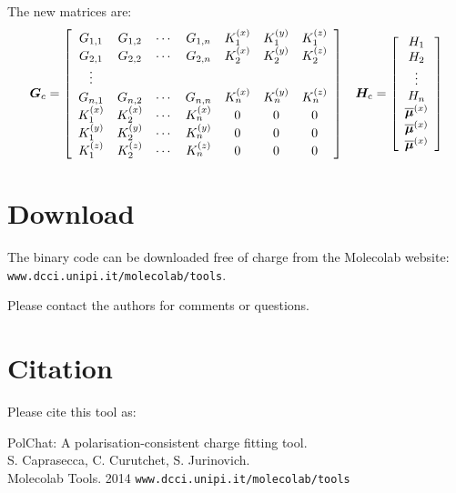 \documentclass[a4paper]{report}
\newcommand{\bs}{\boldsymbol}
\newcommand{\mr}{\mathrm}
\begin{document}
The new matrices are:
\begin{equation}
\bs{G}_c = \left[ \begin{array}{ccccccccr} 
G_{1,1}   & G_{1,2}   & \cdots & G_{1,n}   & K_1^{(x)} & K_1^{(y)} & K_1^{(z)} \\
G_{2,1}   & G_{2,2}   & \cdots & G_{2,n}   & K_2^{(x)} & K_2^{(y)} & K_2^{(z)} \\
\vdots \\
G_{n,1}   & G_{n,2}   & \cdots & G_{n,n}   & K_n^{(x)} & K_n^{(y)} & K_n^{(z)} \\
K_1^{(x)} & K_2^{(x)} & \cdots & K_n^{(x)} & 0         & 0         & 0         \\
K_1^{(y)} & K_2^{(y)} & \cdots & K_n^{(y)} & 0         & 0         & 0         \\
K_1^{(z)} & K_2^{(z)} & \cdots & K_n^{(z)} & 0         & 0         & 0         \\
\end{array} \right] \hspace{0.3cm} \bs{H}_\mr{c} = \left[ \begin{array}{c} H_1 \\ H_2
\\ \vdots \\ H_n \\ \overline{\bs{\mu}}^{(x)} \\
\overline{\bs{\mu}}^{(x)} \\ \overline{\bs{\mu}}^{(x)} \end{array}
\right]
\end{equation}

\section*{Download}

The binary code can be downloaded free of charge from the Molecolab website:
\texttt{www.dcci.unipi.it/molecolab/tools}.

Please contact the authors for comments or questions.

\section*{Citation}

Please cite this tool as: 

\indent PolChat: A polarisation-consistent charge fitting tool. \\
\indent S. Caprasecca, C. Curutchet, S. Jurinovich. \\
\indent Molecolab Tools. 2014 \texttt{www.dcci.unipi.it/molecolab/tools}
\end{document}
